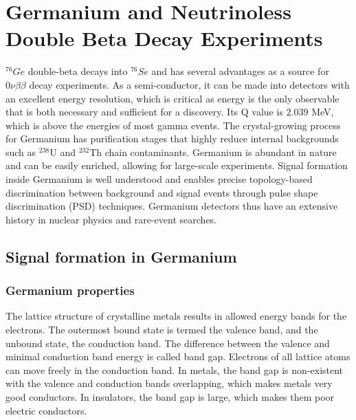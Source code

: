 \chapter{Germanium and Neutrinoless Double Beta Decay Experiments}
\label{chap:detectors}

${}^{76}Ge$ double-beta decays into ${}^{76}Se$ and has several advantages as a source for $0\nu\beta\beta$ decay experiments. As a semi-conductor, it can be made into detectors with an excellent energy resolution, which is critical as energy is the only observable that is both necessary and sufficient for a discovery. Its Q value is $2.039$ MeV, which is above the energies of most gamma events. The crystal-growing process for Germanium has purification stages that highly reduce internal backgrounds such as $^{238}$U and $^{232}$Th chain contaminants. Germanium is abundant in nature and can be easily enriched, allowing for large-scale experiments. Signal formation inside Germanium is well understood and enables precise topology-based discrimination between background and signal events through pulse shape discrimination (PSD) techniques. Germanium detectors thus have an extensive history in nuclear physics and rare-event searches.





\section{Signal formation in Germanium}
\subsection{Germanium properties}
The lattice structure of crystalline metals results in allowed energy bands for the electrons. The outermost bound state is termed the valence band, and the unbound state, the conduction band. The difference between the valence and minimal conduction band energy is called band gap. Electrons of all lattice atoms can move freely in the conduction band. In metals, the band gap is non-existent with the valence and conduction bands overlapping, which makes metals very good conductors. In insulators, the band gap is large, which makes them poor electric conductors.

